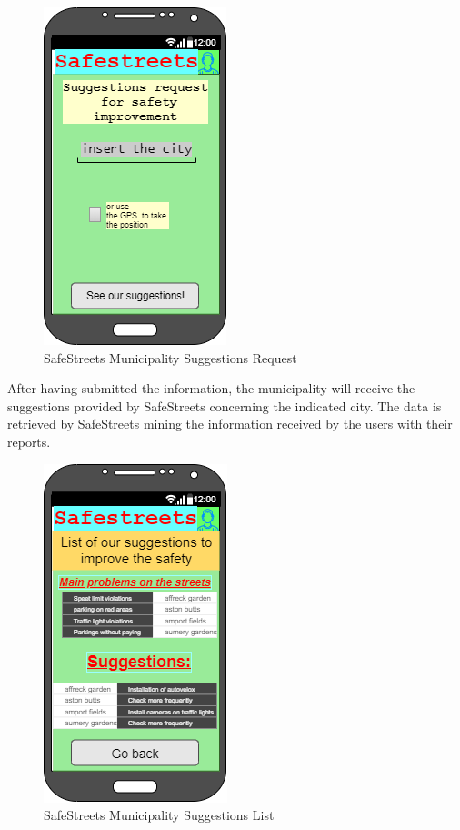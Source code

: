 \documentclass[titlepage]{article}
\begin{document}
\begin{itemize}
\begin{itemize}
	\begin{figure}[h]
	\includegraphics[scale=0.8]{Mockups/Request for safety improvements.png}
	\centering
	\caption{SafeStreets Municipality Suggestions Request}
	\end{figure}
	\FloatBarrier
	
	\newpage
	
	
	
	After having submitted the information, the municipality will receive the suggestions provided by SafeStreets concerning the indicated city. The data is retrieved by SafeStreets mining the information received by the users with their reports.
	
	
	\begin{figure}[h]
	\includegraphics[scale=0.95]{Mockups/List of suggestions.png}
	\centering
	\caption{SafeStreets Municipality Suggestions List}
	\end{figure}
	\FloatBarrier
	
	\newpage
	
		
		
	\end{itemize}

		
		
	\end{itemize}
	
\end{document}
